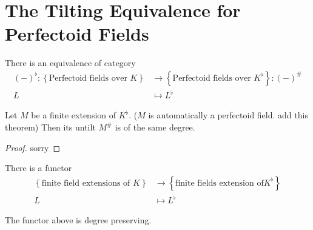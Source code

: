
\section{The Tilting Equivalence for Perfectoid Fields}

\begin{definition}
    \label{Tilting Functor}
    \notready

    There is an equivalence of category
    \begin{align*}
        (-)^\flat : \left \{ \text{Perfectoid fields over } K \right \} & \to \left \{ \text{Perfectoid fields over } K^\flat \right \} : (-)^\# \\
        L & \mapsto L^\flat
    \end{align*}

\end{definition}

\begin{theorem}
    \label{untilt_same_degree}
    \notready

    Let $M$ be a finite extension of $K^\flat$. ($M$ is automatically a perfectoid field. add this theorem) Then its untilt $M^\#$ is of the same degree. 

\end{theorem}

\begin{proof}
    \notready

    sorry
\end{proof}



\begin{definition}
    \label{Tilting Functor (Finite Extension)}
    \notready

    There is a functor 
    \begin{align*}
        \left \{ \text{finite field extensions of } K \right \} & \to \left \{ \text{finite fields extension of} K^\flat \right \} \\
        L & \mapsto L^\flat
    \end{align*}

\end{definition}

\begin{theorem}
    \label{tilting_finite_degree_preserving}
    \notready

    The functor above is degree preserving.
\end{theorem}

